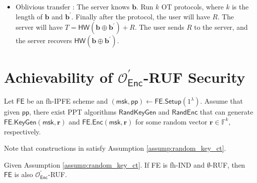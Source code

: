 \begin{itemize}
	\item Oblivious transfer \cite{cryptoeprint:2012/586}: The server knows $\mathbf{b}$. Run $k$ OT protocols, where $k$ is the length of $\mathbf{b}$ and $\mathbf{b}^\prime$. Finally after the protocol, the user will have $R$. The server will have $T = \textsf{HW}(\mathbf{b} \oplus \mathbf{b}^\prime) + R$. The user sends $R$ to the server, and the server recovers $\textsf{HW}(\mathbf{b} \oplus \mathbf{b}^\prime)$.

\end{itemize}


\newpage


\iffalse

\section{Achievability of $\mathcal{O}^\prime_{\textsf{Enc}}$-RUF Security}

\begin{assumption}
\label{assump:random_key_ct}

Let $\textsf{FE}$ be an fh-IPFE scheme and $(\textsf{msk}, \textsf{pp}) \gets \textsf{FE.Setup}(1^\lambda)$. Assume that given $\textsf{pp}$, there exist PPT algorithms $\textsf{RandKeyGen}$ and $\textsf{RandEnc}$ that can generate $\textsf{FE.KeyGen}(\textsf{msk}, \mathbf{r})$ and $\textsf{FE.Enc}(\textsf{msk}, \mathbf{r})$ for some random vector $\mathbf{r} \in \mathbb{F}^k$, respectively.

\end{assumption}

Note that constructions in \cite{10.1007/978-3-319-45871-7_24, cryptoeprint:2016/440} satisfy Assumption \ref{assump:random_key_ct}.

\begin{theorem}
\label{thm:fh-IPFE:ind-OEnc-ruf}
Given Assumption \ref{assump:random_key_ct}. If \textsf{FE} is fh-IND and $\emptyset$-RUF, then $\textsf{FE}$ is also $\mathcal{O}^\prime_{\textsf{Enc}}$-RUF.

\end{theorem}

